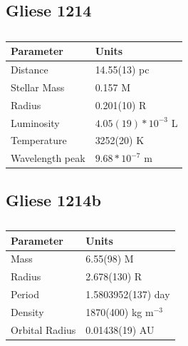 \documentclass[12pt,a4paper]{article}
\begin{document}
\subsection{Gliese 1214}
\begin{table}[]
\centering
\caption{}
\label{tab:star-char}
\begin{tabular}{l|l}
Parameter    & Units                               \\ \hline
Distance     & 14.55(13) pc \cite{Anglada_2013}    \\
Stellar Mass & 0.157 M                             \\
Radius       & 0.201(10) R \cite{Anglada_2013}     \\
Luminosity   & $4.05(19) * 10^{-3}$ L \cite{Anglada_2013} \\
Temperature  & 3252(20) K \cite{Anglada_2013}      \\
Wavelength peak   & $9.68 * 10^{-7}$ m      
\end{tabular}
\end{table}

\subsection{Gliese 1214b}
\begin{table}[]
\centering
\caption{}
\label{tab:planet-char}
\begin{tabular}{l|l}
\textbf{Parameter} & \textbf{Units}                     \\ \hline
Mass               & 6.55(98) M                         \\
Radius             & 2.678(130) R                       \\
Period             & 1.5803952(137) day                 \\
Density            & 1870(400) kg m$^{-3}$              \\
Orbital Radius     & 0.01438(19) AU                     
\end{tabular}
\end{table}
\end{document}
